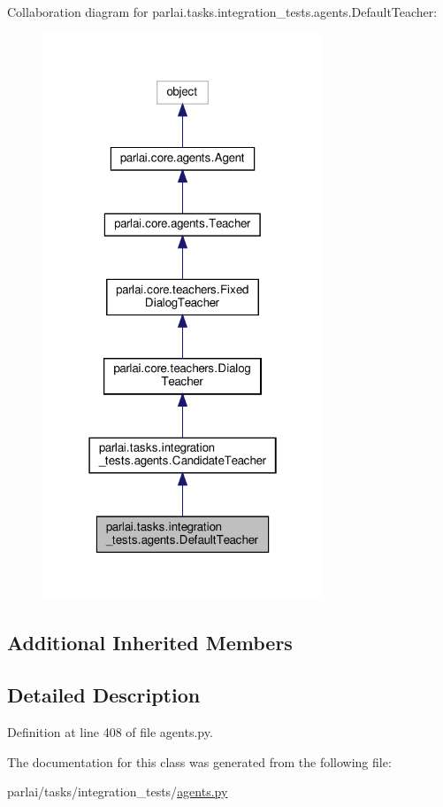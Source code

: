 Collaboration diagram for parlai.\+tasks.\+integration\+\_\+tests.\+agents.\+Default\+Teacher\+:
\nopagebreak
\begin{figure}[H]
\begin{center}
\leavevmode
\includegraphics[width=238pt]{classparlai_1_1tasks_1_1integration__tests_1_1agents_1_1DefaultTeacher__coll__graph}
\end{center}
\end{figure}
\subsection*{Additional Inherited Members}


\subsection{Detailed Description}


Definition at line 408 of file agents.\+py.



The documentation for this class was generated from the following file\+:\begin{DoxyCompactItemize}
\item 
parlai/tasks/integration\+\_\+tests/\hyperlink{parlai_2tasks_2integration__tests_2agents_8py}{agents.\+py}\end{DoxyCompactItemize}
